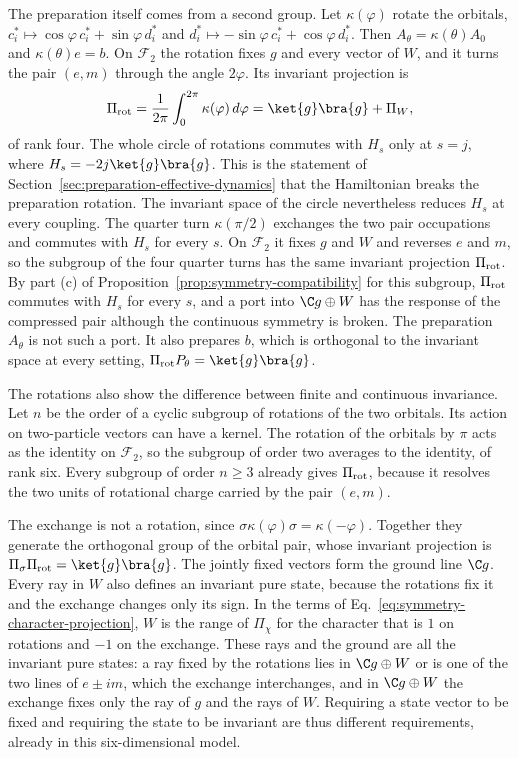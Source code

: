 The preparation itself comes from a second group. Let $\kappa(\varphi)$ rotate the orbitals, $c_i^*\mapsto\cos\varphi\,c_i^*+\sin\varphi\,d_i^*$ and $d_i^*\mapsto-\sin\varphi\,c_i^*+\cos\varphi\,d_i^*$. Then $A_\theta=\kappa(\theta)A_0$ and $\kappa(\theta)e=b$. On $\mathcal F_2$ the rotation fixes $g$ and every vector of $W$, and it turns the pair $(e,m)$ through the angle $2\varphi$. Its invariant projection is
\begin{equation}
 \Pi_{\rm rot}=\frac1{2\pi}\int_0^{2\pi}\kappa(\varphi)\,d\varphi=\ket{g}\bra{g}+\Pi_W ,
 \label{eq:symmetry-pair-rotation}
\end{equation}
of rank four. The whole circle of rotations commutes with $H_s$ only at $s=j$, where $H_s=-2j\ket{g}\bra{g}$. This is the statement of Section~\ref{sec:preparation-effective-dynamics} that the Hamiltonian breaks the preparation rotation. The invariant space of the circle nevertheless reduces $H_s$ at every coupling. The quarter turn $\kappa(\pi/2)$ exchanges the two pair occupations and commutes with $H_s$ for every $s$. On $\mathcal F_2$ it fixes $g$ and $W$ and reverses $e$ and $m$, so the subgroup of the four quarter turns has the same invariant projection $\Pi_{\rm rot}$. By part (c) of Proposition~\ref{prop:symmetry-compatibility} for this subgroup, $\Pi_{\rm rot}$ commutes with $H_s$ for every $s$, and a port into $\C g\oplus W$ has the response of the compressed pair although the continuous symmetry is broken. The preparation $A_\theta$ is not such a port. It also prepares $b$, which is orthogonal to the invariant space at every setting, $\Pi_{\rm rot}P_\theta=\ket{g}\bra{g}$.

The rotations also show the difference between finite and continuous invariance. Let $n$ be the order of a cyclic subgroup of rotations of the two orbitals. Its action on two-particle vectors can have a kernel. The rotation of the orbitals by $\pi$ acts as the identity on $\mathcal F_2$, so the subgroup of order two averages to the identity, of rank six. Every subgroup of order $n\geq3$ already gives $\Pi_{\rm rot}$, because it resolves the two units of rotational charge carried by the pair $(e,m)$.

The exchange is not a rotation, since $\sigma\kappa(\varphi)\sigma=\kappa(-\varphi)$. Together they generate the orthogonal group of the orbital pair, whose invariant projection is $\Pi_\sigma\Pi_{\rm rot}=\ket{g}\bra{g}$. The jointly fixed vectors form the ground line $\C g$. Every ray in $W$ also defines an invariant pure state, because the rotations fix it and the exchange changes only its sign. In the terms of Eq.~\eqref{eq:symmetry-character-projection}, $W$ is the range of $\Pi_\chi$ for the character that is $1$ on rotations and $-1$ on the exchange. These rays and the ground are all the invariant pure states: a ray fixed by the rotations lies in $\C g\oplus W$ or is one of the two lines of $e\pm im$, which the exchange interchanges, and in $\C g\oplus W$ the exchange fixes only the ray of $g$ and the rays of $W$. Requiring a state vector to be fixed and requiring the state to be invariant are thus different requirements, already in this six-dimensional model.
